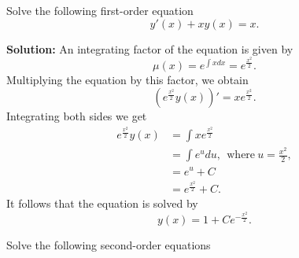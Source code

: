 \documentclass[11pt]{exam}
\begin{document}
\begin{questions}
\addpoints 

\newpage
\question[4]  Solve the following first-order equation
\begin{equation*}
y'(x)+xy(x)=x.
\end{equation*}

\textbf{Solution:} An integrating factor of the equation is given by 
\begin{equation*}
\mu(x)=e^{\int x dx} = e^{\frac{x^2}{2}}.
\end{equation*}
Multiplying the equation by this factor, we obtain
\begin{equation*}
(e^{\frac{x^2}{2}}y(x))'= xe^{\frac{x^2}{2}}.
\end{equation*}
Integrating both sides we get 
\begin{align*}
e^{\frac{x^2}{2}}y(x) & = \int xe^{\frac{x^2}{2}} \\
& = \int e^{u} du, \ \ \mbox{where} \ u = \frac{x^2}{2}, \\
& = e^{u}+C \\
& = e^{\frac{x^2}{2}}+C.
\end{align*}
It follows that the equation is solved by 
\begin{equation*}
y(x)=1+Ce^{-\frac{x^2}{2}}.
\end{equation*}
\addpoints

\newpage
\question Solve the following second-order equations
\end{questions}
\end{document}
